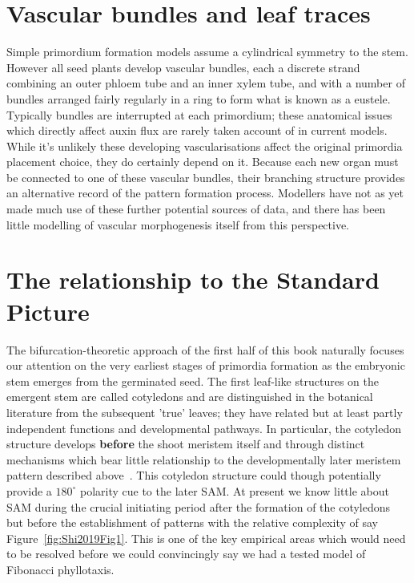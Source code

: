 \section{Vascular bundles and leaf traces}
Simple primordium formation models assume a cylindrical symmetry to the stem. However all seed plants develop vascular bundles, each a discrete strand combining an outer phloem tube and an inner xylem tube, and with a number of bundles arranged fairly regularly in a ring to form what is known as a eustele. Typically bundles are interrupted at each primordium; these anatomical issues which directly affect auxin flux are rarely taken account of in current models. While it's unlikely these developing vascularisations affect the original primordia placement choice, they do certainly depend on it. Because each new organ must be connected to one of these vascular bundles, their branching structure provides an alternative record of the pattern formation process. 
Modellers have not as yet made much use of these further potential sources of data, and  there has been little modelling of vascular morphogenesis itself from this perspective.
	


\section{The relationship to the Standard Picture}
\label{sec:jugacy}
The bifurcation-theoretic approach of the first half of this book naturally focuses our attention on the very earliest stages of primordia formation as the embryonic stem emerges from the germinated seed.  The first leaf-like structures on the emergent stem are called cotyledons and are distinguished in the botanical literature from the subsequent 'true' leaves; they have related but at least partly independent functions and developmental pathways. In particular, the cotyledon structure develops \textbf{before} the shoot meristem itself and through distinct mechanisms which bear little relationship to the developmentally later meristem pattern described above~\autocite{yoshidaGeneticControlPlant2014}. This cotyledon structure could though potentially provide a $180^\circ$ polarity cue to the later SAM. At present we know  little about SAM during the crucial initiating period after the formation of the cotyledons but before the establishment of patterns with the relative complexity of say Figure~\ref{fig:Shi2019Fig1}. This is one of the key empirical areas which would need to be resolved before we could convincingly say we had a tested model of Fibonacci phyllotaxis. 

